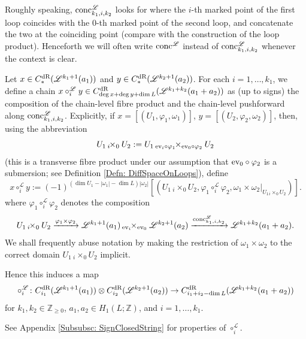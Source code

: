 \documentclass[10pt]{amsart}
\numberwithin{equation}{section}
\theoremstyle{plain}
\theoremstyle{definition}
\theoremstyle{remark}
\numberwithin{equation}{section}
\newcommand{\Z}{\mathbb{Z}}
\newcommand{\ev}{\textup{ev}}
\newcommand{\ms}[1]{\mathscr{#1}}
\newcommand{\dR}{\textup{dR}}
\newcommand{\fiberprod}[2]{\,_{#1}\!\!\times_{#2} }
\newcommand{\conc}{\textup{conc}^\mathscr{L}}
\begin{document}
{	Roughly speaking, $\conc_{k_1,i,k_2}$ looks for where the $i$-th marked point of the first loop coincides with the $0$-th marked point of the second loop, and concatenate the two at the coinciding point (compare with the construction of the loop product).
	Henceforth we will often write $\conc$ instead of $\conc_{k_1,i,k_2}$ whenever the context is clear.
	

Let $x\in C_{*}^\dR( \mathscr{L}^{k_1+1}(a_1))$ and $y\in C_{*}^\dR( \mathscr{L}^{k_2+1}(a_2))$.
For each $i=1,\dots, k_1$, we define a chain $x\circ_i^\mathscr{L} y\in  C^\dR_{\deg x+ \deg y+\dim L}(\mathscr{L}^{k_1+k_2}(a_1+a_2))$ as (up to signs) the composition of the chain-level fibre product and the chain-level pushforward along $\conc_{k_1,i,k_2}$. Explicitly, if $x=[(U_1,\varphi_1,\omega_1)]$, $y=[(U_2,\varphi_2, \omega_2)]$, then, using the abbreviation \[U_1\fiberprod{i}{0} U_2:= U_1\fiberprod{\ev_i\circ \varphi_1}{\ev_0\circ \varphi_2} U_2\] (this is a transverse fibre product under our assumption that $\ev_0\circ \varphi_2$ is a submersion; see Definition \ref{Defn: DiffSpaceOnLoops}), define
\begin{equation} \label{Eq: PartialLoopPre}
x\circ_i^\mathscr{L} y:= (-1)^{(\dim U_1-|\omega_1| -\dim L)|\omega_2|} [(U_1\fiberprod{i}{0} U_2, \varphi_1\circ_i^\mathscr{L} \varphi_2, \omega_1\times \omega_2|_{U_1{}_i\times_0 U_2})].\end{equation}
where $\varphi_1\circ_i^\mathscr{L} \varphi_2$ denotes the composition
\[
	U_1\fiberprod{i}{0} U_2 \xrightarrow{\varphi_1\times \varphi_2}\mathscr{L}^{k_1+1}(a_1)\fiberprod{\ev_i}{\ev_0} \mathscr{L}^{k_2+1}(a_2) \xrightarrow{\conc_{k_1,i,k_2}} \mathscr{L}^{k_1+k_2}(a_1+a_2).
\]
We shall frequently abuse notation by making the restriction of $\omega_1\times \omega_2$ to the correct domain $U_1\fiberprod{i}{0} U_2$ implicit.

Hence this induces a map 
\[
	\circ_i^\mathscr{L}\colon C_{i_1}^\dR(\mathscr{L}^{k_1+1}(a_1))\otimes C^\dR_{i_2}(\mathscr{L}^{k_2+1}(a_2))\to C^\dR_{i_1+i_2-\dim L}(\mathscr{L}^{k_1+k_2}(a_1+a_2))
\]
for $k_1,k_2\in \Z_{\geq 0}$, $a_1,a_2\in H_1(L;\Z)$, and $i=1,\dots, k_1$.



See Appendix \ref{Subsubsc: SignClosedString} for properties of $\circ_i^\ms{L}$.

}
\end{document}
